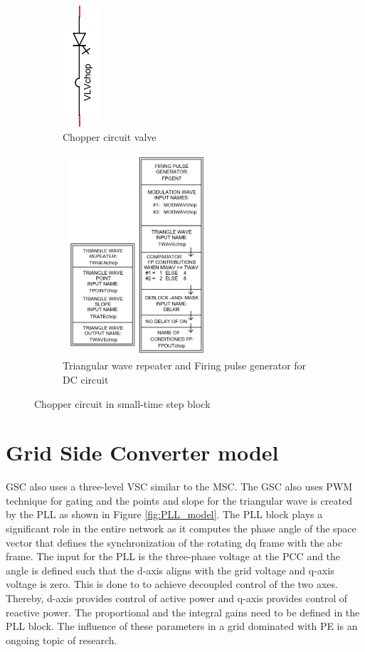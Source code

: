 \begin{figure}[H]
\centering
\begin{subfigure}{.3\textwidth}
  \centering
  \includegraphics[height=4.5cm,width=1.5cm]{Diagrams/Appendix_A/Chopper_circuit.PNG}
  \caption{Chopper circuit valve}
  \label{fig:Chopper_circuit}
\end{subfigure}%
\begin{subfigure}{.5\textwidth}
  \centering
  \includegraphics[height=7.5cm,width=5.5cm]{Diagrams/Appendix_A/Chopper_circuit_firing.PNG}
  \caption{Triangular wave repeater and Firing pulse generator for DC circuit}
  \label{fig:Chopper_circuit_firing}
\end{subfigure}
\caption{Chopper circuit in small-time step block}
\label{fig:aerodynamic_model_data}
\end{figure}

\section{Grid Side Converter model}
\gls{GSC} also uses a three-level \gls{VSC} similar to the \gls{MSC}. The \gls{GSC} also uses \gls{PWM} technique for gating and the points and slope for the triangular wave is created by the \gls{PLL} as shown in Figure \ref{fig:PLL_model}. The \gls{PLL} block plays a significant role in the entire network as it computes the phase angle of the space vector that defines the synchronization of the rotating dq frame with the abc frame. The input for the \gls{PLL} is the three-phase voltage at the \gls{PCC} and the angle is defined such that the d-axis aligns with the grid voltage and q-axis voltage is zero. This is done to to achieve decoupled control of the two axes. Thereby, d-axis provides control of active power and q-axis provides control of reactive power. The proportional and the integral gains need to be defined in the \gls{PLL} block. The influence of these parameters in a grid dominated with \gls{PE} is an ongoing topic of research.

